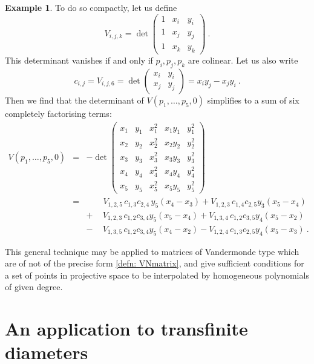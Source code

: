 \documentclass[10pt]{amsart}
\theoremstyle{definition}
\newtheorem{example}[thm]{Example}
\theoremstyle{remark}
\numberwithin{equation}{section}
\newcommand{\0}{\color{blue}{\mathsf{0}}}
\begin{document}
\begin{example}
To do so compactly,    let us define 
\[ V_{i,j,k} = \det \begin{pmatrix} 1 & x_i & y_i \\  1 & x_j & y_j \\ 1& x_k & y_k \end{pmatrix}  \ . \] 
This determinant vanishes if and only if $p_i,p_j,p_k$ are colinear. Let us also write 
\[  c_{i,j} =V_{i,j,6}=    \det \begin{pmatrix}  x_i & y_i \\  x_j & y_j  \end{pmatrix} =  x_i y_j - x_j y_i \ . \]
Then we find that the determinant of $V(p_1,\ldots, p_5,0)$ simplifies to  a sum of six  completely factorising terms:  
 \begin{eqnarray}  V(p_1,\ldots, p_5, 0 ) &=&  -  
\det \begin{pmatrix}   x_1 & y_1 & x_1^2 & x_1y_1 & y_1^2  \\ 
 x_2 & y_2 & x_2^2 & x_2y_2 & y_2^2  \\
 x_3 & y_3 & x_3^2 & x_3y_3 & y_3^2  \\
 x_4 & y_4 & x_4^2 & x_4y_4 & y_4^2  \\
 x_5 & y_5 & x_5^2 & x_5y_5 & y_5^2  
\end{pmatrix}  \nonumber \\
 & = & \qquad  V_{1,2,5}  \, c_{1,3} c_{2,4} \, y_5 (x_4-x_3)   +V_{1,2,3} \,    c_{1,4} c_{2,5}  y_3 (x_5-x_4)       \nonumber   \\ 
   &  & +  \quad \,   V_{1,2,3} \, c_{1,2} c_{3,4} y_5 (x_5-x_4)      +   V_{1,3,4}  \, c_{1,2} c_{3,5}  y_4 (x_5-x_2)  \nonumber \\ 
    &  &  -  \quad  \, V_{1,3,5} \, c_{1,2} c_{3,4}   y_5(x_4-x_2)  -   V_{1,2,4}  \, c_{1,3} c_{2,5} y_4 (x_5-x_3) \ .   \nonumber
\end{eqnarray}

\end{example}

This  general technique may be applied to  matrices of Vandermonde type which are of not of the precise form \eqref{defn: VNmatrix}, and give sufficient conditions for a set of points in projective space to be interpolated by  homogeneous polynomials of given degree.



\section{An application to transfinite diameters} \label{sect: applicationtransfinite}
\end{document}
